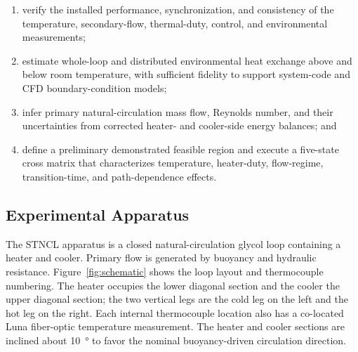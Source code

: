 \documentclass[11pt]{article}
\begin{document}
\begin{enumerate}
    \item verify the installed performance, synchronization, and consistency of the temperature, secondary-flow, thermal-duty, control, and environmental measurements;
    \item estimate whole-loop and distributed environmental heat exchange above and below room temperature, with sufficient fidelity to support system-code and CFD boundary-condition models;
    \item infer primary natural-circulation mass flow, Reynolds number, and their uncertainties from corrected heater- and cooler-side energy balances; and
    \item define a preliminary demonstrated feasible region and execute a five-state cross matrix that characterizes temperature, heater-duty, flow-regime, transition-time, and path-dependence effects.
\end{enumerate}


\subsection{Experimental Apparatus}
\label{sec:functional}

The STNCL apparatus is a closed natural-circulation glycol loop containing a heater and cooler. Primary flow is generated by buoyancy and hydraulic resistance. Figure~\ref{fig:schematic} shows the loop layout and thermocouple numbering. The heater occupies the lower diagonal section and the cooler the upper diagonal section; the two vertical legs are the cold leg on the left and the hot leg on the right. Each internal thermocouple location also has a co-located Luna fiber-optic temperature measurement. The heater and cooler sections are inclined about \SI{10}{\degree} to favor the nominal buoyancy-driven circulation direction. 
\end{document}
